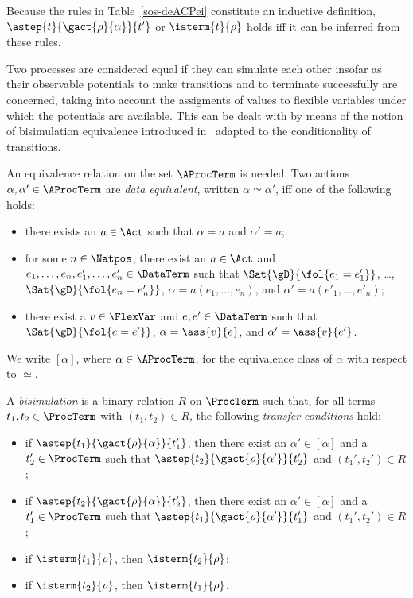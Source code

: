\documentclass[runningheads]{llncs}
\begin{document}
Because the rules in Table~\ref{sos-deACPei} constitute an inductive 
definition, \mbox{$\astep{t}{\gact{\rho}{\alpha}}{t'}$} or 
$\isterm{t}{\rho}$ holds iff it can be inferred from these rules.

Two processes are considered equal if they can simulate each other 
insofar as their observable potentials to make transitions and to 
terminate successfully are concerned, taking into account the assigments 
of values to flexible variables under which the potentials are available.
This can be dealt with by means of the notion of bisimulation 
equivalence introduced in~\cite{GW96a} adapted to the conditionality of 
transitions.

An equivalence relation on the set $\AProcTerm$ is needed.
Two actions $\alpha,\alpha' \in \AProcTerm$ are \emph{data equivalent}, 
written $\alpha \simeq \alpha'$, iff one of the following holds:
\begin{itemize}
\item
there exists an $a \in \Act$ such that $\alpha = a$ 
and $\alpha' = a$;
\item
for some $n \in \Natpos$,
there exist an $a \in \Act$ and 
$e_1,\dots,e_n,e'_1,\dots,e'_n \in \DataTerm$
such that 
$\Sat{\gD}{\fol{e_1 = e'_1}}$, \ldots, $\Sat{\gD}{\fol{e_n = e'_n}}$,
$\alpha = a(e_1,\dots,e_n)$, and $\alpha' = a(e'_1,\dots,e'_n)$;
\item
there exist a $v \in \FlexVar$ and $e,e' \in \DataTerm$ such that 
$\Sat{\gD}{\fol{e = e'}}$, $\alpha = \ass{v}{e}$, and 
$\alpha' = \ass{v}{e'}$.
\end{itemize}
We write $[\alpha]$, where $\alpha \in \AProcTerm$, for the equivalence 
class of $\alpha$ with respect to $\simeq$.

A \emph{bisimulation} is a binary relation $R$ on $\ProcTerm$ such that, 
for all terms $t_1,t_2 \in \ProcTerm$ with $(t_1,t_2) \in R$, the 
following \emph{transfer conditions} hold:
\begin{itemize}
\item
if $\astep{t_1}{\gact{\rho}{\alpha}}{t_1'}$, then there exist an 
$\alpha' \in [\alpha]$ and a $t_2' \in \ProcTerm$ such that 
$\astep{t_2}{\gact{\rho}{\alpha'}}{t_2'}$ and 
$(t_1',t_2') \in R$;
\item
if $\astep{t_2}{\gact{\rho}{\alpha}}{t_2'}$, then there exist an 
$\alpha' \in [\alpha]$ and a $t_1' \in \ProcTerm$ such that 
$\astep{t_1}{\gact{\rho}{\alpha'}}{t_1'}$ and 
$(t_1',t_2') \in R$;
\item
if $\isterm{t_1}{\rho}$, then  $\isterm{t_2}{\rho}$;
\item
if $\isterm{t_2}{\rho}$, then  $\isterm{t_1}{\rho}$.
\end{itemize}
\end{document}

